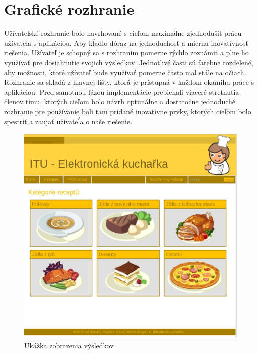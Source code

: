 \documentclass[12pt,a4paper,titlepage,final]{article}
\begin{document}
\section{Grafické rozhranie}
Užívateľské rozhranie bolo navrhované s cieľom maximálne zjednodušiť prácu užívateľa s aplikáciou. Aby kĺadlo dôraz na jednoduchosť a miernu inovatívnosť riešenia. Užívateľ je schopný sa s rozhraním pomerne rýchlo zoznámiť a plne ho využívať pre dosiahnutie svojich výsledkov. Jednotlivé časti sú farebne rozdelené, aby možnosti, ktoré užívateľ bude využívať pomerne často mal stále na očiach. Rozhranie sa skladá z hlavnej lišty, ktorá je prístupná v každom okamihu práce s aplikáciou. Pred samotnou fázou implementácie prebiehali viaceré stretnutia členov tímu, ktorých cieľom bolo návrh optimálne a dostatočne jednoduché rozhranie pre používanie boli tam pridané inovatívne prvky, ktorých cieľom bolo spestriť a zaujať užívateĺa o naše riešenie.\cite{Stephen:Rozhrania}
\begin{figure}

\begin{center}

\includegraphics[scale=0.7]{img/home.eps} 
\caption{Ukážka zobrazenia výsledkov}
\label{koncept}

\end{center}

\end{figure}
\end{document}
